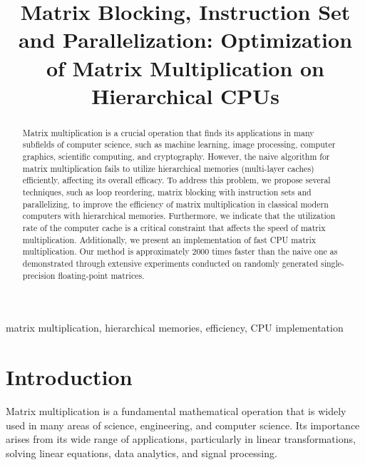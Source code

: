 \documentclass[conference]{IEEEtran}
\begin{document}
	
	\title{Matrix Blocking, Instruction Set and Parallelization: Optimization of Matrix Multiplication on Hierarchical CPUs}
	
	\author{
	}
	
	\maketitle
	
	\begin{abstract}
		Matrix multiplication is a crucial operation that finds its applications in many subfields of computer science, such as machine learning, image processing, computer graphics, scientific computing, and cryptography. However, the naive algorithm for matrix multiplication fails to utilize hierarchical memories (multi-layer caches) efficiently, affecting its overall efficacy. To address this problem, we propose several techniques, such as loop reordering, matrix blocking with instruction sets and parallelizing, to improve the efficiency of matrix multiplication in classical modern computers with hierarchical memories. Furthermore, we indicate that the utilization rate of the computer cache is a critical constraint that affects the speed of matrix multiplication. Additionally, we present an implementation of fast CPU matrix multiplication. Our method is approximately 2000 times faster than the naive one as demonstrated through extensive experiments conducted on randomly generated single-precision floating-point matrices.
	\end{abstract}
	
	\begin{IEEEkeywords}
		matrix multiplication, hierarchical memories, efficiency, CPU implementation
	\end{IEEEkeywords}
	
	\section{Introduction}
	Matrix multiplication is a fundamental mathematical operation that is widely used in many areas of science, engineering, and computer science. Its importance arises from its wide range of applications, particularly in linear transformations, solving linear equations, data analytics, and signal processing. 
	
\end{document}
